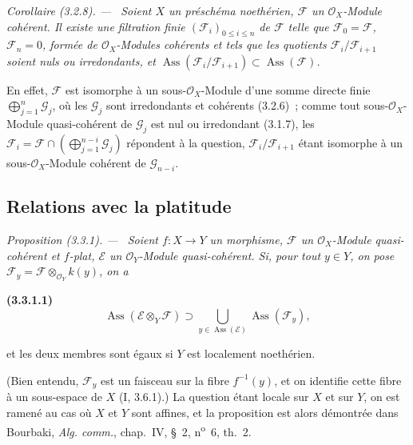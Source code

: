 \documentclass[10pt,oneside]{book}
\makeatletter
\newenvironment{env}[1][]{\par\medskip\noindent\textbf{(#1)}\ }{\par}
\newenvironment{proposition}[1][]{%
  \par\medskip\noindent\itshape Proposition (#1). ---\ }{\par}
\newenvironment{corollary}[1][]{%
  \par\medskip\noindent\itshape Corollaire (#1). ---\ }{\par}
\newcommand{\EGAReaderTarget}[2]{\hypertarget{#1}{}\@bsphack\begingroup\def\@currentHref{#1}\label{#2}\endgroup\@esphack}
\makeatother
\begin{document}
\begin{corollary}[3.2.8]
\label{IV.2.3.2.8-fr}
Soient $X$ un préschéma noethérien, $\mathcal F$ un $\mathcal O_X$-Module
cohérent. Il existe une filtration finie $(\mathcal F_i)_{0\le i\le n}$ de
$\mathcal F$ telle que $\mathcal F_0=\mathcal F$, $\mathcal F_n=0$, formée de
$\mathcal O_X$-Modules cohérents et tels que les quotients
$\mathcal F_i/\mathcal F_{i+1}$ soient nuls ou irredondants, et
$\operatorname{Ass}(\mathcal F_i/\mathcal F_{i+1})
\subset\operatorname{Ass}(\mathcal F)$.
\end{corollary}

En effet, $\mathcal F$ est isomorphe à un sous-$\mathcal O_X$-Module d'une
somme directe finie $\bigoplus_{j=1}^n\mathcal G_j$, où les $\mathcal G_j$
sont irredondants et cohérents (3.2.6)~; comme tout sous-$\mathcal O_X$-Module
quasi-cohérent de $\mathcal G_j$ est nul ou irredondant (3.1.7), les
$\mathcal F_i=\mathcal F\cap(\bigoplus_{j=1}^{n-i}\mathcal G_j)$ répondent à
la question, $\mathcal F_i/\mathcal F_{i+1}$ étant isomorphe à un
sous-$\mathcal O_X$-Module cohérent de $\mathcal G_{n-i}$.

\subsection{Relations avec la platitude}

\begin{proposition}[3.3.1]
\EGAReaderTarget{ega4.c04.prop.3-3-1}{IV.2.3.3.1-fr}
Soient $f:X\to Y$ un morphisme, $\mathcal F$ un $\mathcal O_X$-Module
quasi-cohérent et $f$-plat, $\mathcal E$ un $\mathcal O_Y$-Module
quasi-cohérent. Si, pour tout $y\in Y$, on pose
$\mathcal F_y=\mathcal F\otimes_{\mathcal O_Y}k(y)$, on a
\end{proposition}

\begin{env}[3.3.1.1]
\label{IV.2.3.3.1.1-fr}
\[
\operatorname{Ass}(\mathcal E\otimes_Y\mathcal F)
\supset\bigcup_{y\in\operatorname{Ass}(\mathcal E)}
\operatorname{Ass}(\mathcal F_y),
\]
\end{env}

et les deux membres sont égaux si $Y$ est localement noethérien.

(Bien entendu, $\mathcal F_y$ est un faisceau sur la fibre $f^{-1}(y)$, et on
identifie cette fibre à un sous-espace de $X$ (I, 3.6.1).) La question étant
locale sur $X$ et sur $Y$, on est ramené au cas où $X$ et $Y$ sont affines,
et la proposition est alors démontrée dans Bourbaki, \emph{Alg. comm.},
chap.~IV, \S~2, n\textsuperscript{o}~6, th.~2.
\end{document}
